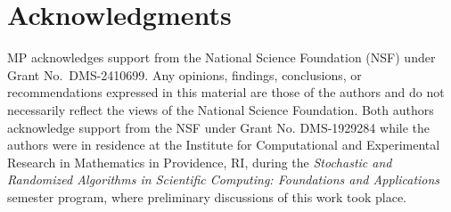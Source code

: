\documentclass[%
  a4paper,
  onecolumn,
  colorlinks,
]{preprint}
\theoremstyle{plain}
\theoremstyle{definition}
\begin{document}
\section*{Acknowledgments}
MP acknowledges support from the National Science Foundation (NSF) under
Grant No.\ DMS-2410699. Any opinions, findings, conclusions, or
recommendations expressed in this material are those of the authors and do not
necessarily reflect the views of the National Science Foundation.
Both authors acknowledge support from the NSF under Grant No. DMS-1929284 while the authors were in residence at the Institute for Computational and Experimental Research in Mathematics in Providence, RI, during the \emph{Stochastic and Randomized Algorithms in Scientific Computing: Foundations and Applications} semester program, where preliminary discussions of this work took place. 


\end{document}
